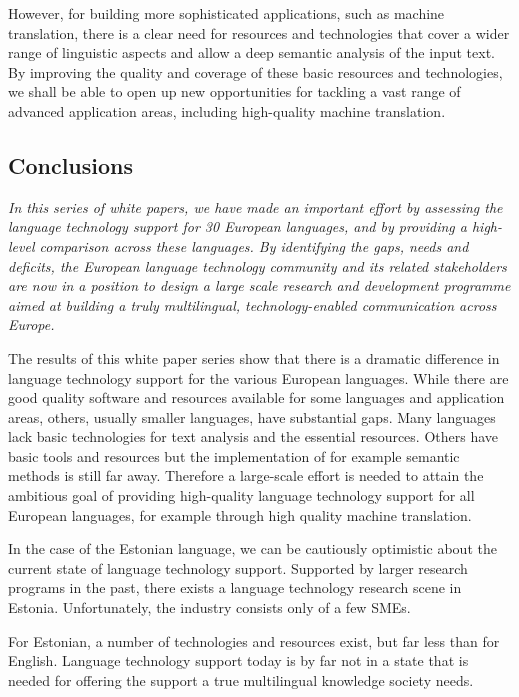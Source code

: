 \begin{multicols}{2}
However, for building more sophisticated applications, such as machine translation, there is a clear need for resources and technologies that cover a wider range of linguistic aspects and allow a deep semantic analysis of the input text. 
By improving the quality and coverage of these basic resources and technologies, we shall be able to open up new opportunities for tackling a vast range of advanced application areas, including high-quality machine translation.


\subsection{Conclusions}

\emph{In this series of white papers, we have made an important effort by assessing the language technology support for 30 European languages, and by providing a high-level comparison across these languages. By identifying the gaps, needs and deficits, the European language technology community and its related stakeholders are now in a position to design a large scale research and development programme aimed at building a truly multilingual, technology-enabled communication across Europe.}

The results of this white paper series show that there is a dramatic difference in language technology support for the various European languages. While there are good quality software and resources available for some languages and application areas, others, usually smaller languages, have substantial gaps. Many languages lack basic technologies for text analysis and the essential resources. Others have basic tools and resources but the implementation of for example semantic methods is still far away. Therefore a large-scale effort is needed to attain the ambitious goal of providing high-quality language technology support for all European languages, for example through high quality machine translation. 

In the case of the Estonian language, we can be cautiously optimistic about the current state of language technology support. Supported by larger research programs in the past, there exists a language technology research scene in Estonia. Unfortunately, the industry consists only of a few SMEs.

For Estonian, a number of technologies and resources exist, but far less than for English. 
Language technology support today is by far not in a state that is needed for offering the support a true multilingual knowledge society needs.


\end{multicols}
